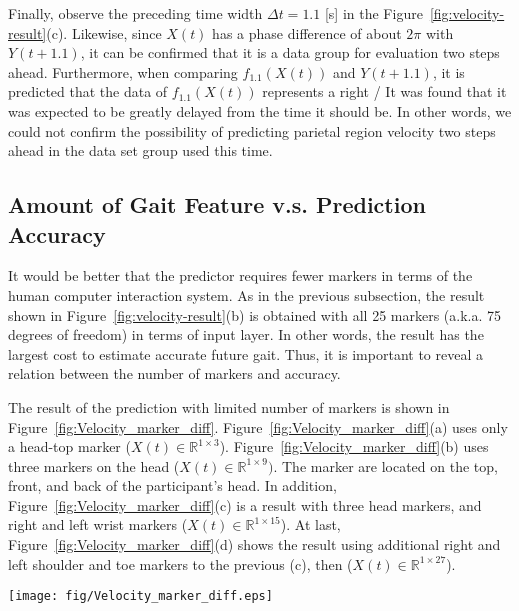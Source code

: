 \documentclass{sigchi}
\begin{document}
Finally, observe the preceding time width $ \Delta t = 1.1 $ [s] in the Figure~\ref{fig:velocity-result}(c). Likewise, since $ X (t) $ has a phase difference of about $ 2 \pi $ with $ Y (t + 1.1) $, it can be confirmed that it is a data group for evaluation two steps ahead. Furthermore, when comparing $ f_ {1.1} (X (t)) $ and $ Y (t + 1.1) $, it is predicted that the data of $ f_ {1.1} (X (t)) $ represents a right / It was found that it was expected to be greatly delayed from the time it should be. In other words, we could not confirm the possibility of predicting parietal region velocity two steps ahead in the data set group used this time.


\subsection{Amount of Gait Feature v.s. Prediction Accuracy}
It would be better that the predictor requires fewer markers in terms of the human computer interaction system. As in the previous subsection, the result shown in Figure~\ref{fig:velocity-result}(b) is obtained with all 25 markers (a.k.a. 75 degrees of freedom) in terms of input layer. In other words, the result has the largest cost to estimate accurate future gait. Thus, it is important to reveal a relation between the number of markers and accuracy. 

The result of the prediction with limited number of markers is shown in Figure~\ref{fig:Velocity_marker_diff}. 
Figure~\ref{fig:Velocity_marker_diff}(a) uses only a head-top marker ($X(t)\in\mathbb{R}^{1 \times 3} $).
Figure~\ref{fig:Velocity_marker_diff}(b) uses three markers on the head ($X(t)\in\mathbb{R}^{1 \times 9}) $. The marker are located on the top, front, and back of the participant's head. In addition, Figure~\ref{fig:Velocity_marker_diff}(c) is a result with three head markers, and right and left wrist markers ($X(t)\in\mathbb{R}^{1 \times 15} $). At last, Figure~\ref{fig:Velocity_marker_diff}(d) shows the result using additional right and left shoulder and toe markers to the previous (c), then ($X(t)\in\mathbb{R}^{1 \times 27} $).
 
\begin{figure*}
\centering
  \texttt{[image: fig/Velocity\_marker\_diff.eps]} \hspace{-15mm} 
  \caption{Prediction result with limited number of markers  ($ \Delta t $ = 0.5)}
  ~\label{fig:Velocity_marker_diff}
\end{figure*}
\end{document}
